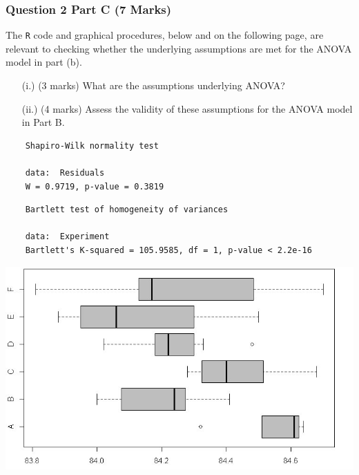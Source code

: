 \documentclass[a4paper,12pt]{article}
\begin{document}
\subsubsection*{Question 2 Part C (7 Marks)}
The \texttt{R} code and graphical procedures, below and on the following page, are relevant to checking whether the underlying assumptions are met for the ANOVA model in part (b).
\begin{itemize}
	\item[(i.)] (3 marks) What are the assumptions underlying ANOVA?
	\item[(ii.)] (4 marks)  Assess the validity of these assumptions for the ANOVA model in Part B.
	
\end{itemize}
\begin{framed}
	\begin{verbatim}
	Shapiro-Wilk normality test
	
	data:  Residuals
	W = 0.9719, p-value = 0.3819
	\end{verbatim}
\end{framed}
\begin{framed}
	\begin{verbatim}
	Bartlett test of homogeneity of variances
	
	data:  Experiment
	Bartlett's K-squared = 105.9585, df = 1, p-value < 2.2e-16
	\end{verbatim}
\end{framed}
\begin{center}
	\includegraphics[scale=0.59]{ExamQ5boxplot}
\end{center}
\newpage
\end{document}
